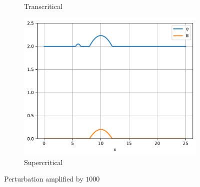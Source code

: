 \documentclass[pt12]{beamer}
\begin{document}
\begin{frame}
\begin{figure}
\begin{subfigure}[b]{0.30\textwidth}
         \caption{Transcritical}
     \end{subfigure}
     \begin{subfigure}[b]{0.30\textwidth}
         \centering
         \includegraphics[width=\textwidth]{sup_not_smooth.pdf}
         \caption{Supercritical}
     \end{subfigure}
         \caption{Perturbation amplified by $1000$}

        \label{convergence}
\end{figure}



\end{frame}
\end{document}
